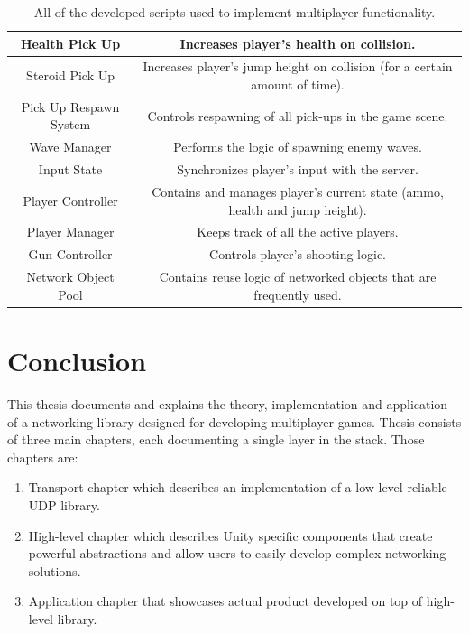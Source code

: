\documentclass[times, utf8, diplomski]{fer}
\begin{document}
\begin{table}[H]
{\begin{tabular}{|c|c|}
			Health Pick Up          & Increases player's health on collision.                                     \\ \hline
			Steroid Pick Up         & Increases player's jump height on collision (for a certain amount of time). \\ \hline
			Pick Up Respawn System  & Controls respawning of all pick-ups in the game scene.                      \\ \hline
			Wave Manager            & Performs the logic of spawning enemy waves.                                 \\ \hline
			Input State             & Synchronizes player's input with the server.                                \\ \hline
			Player Controller       & Contains and manages player's current state (ammo, health and jump height). \\ \hline
			Player Manager          & Keeps track of all the active players.                                      \\ \hline
			Gun Controller          & Controls player's shooting logic.                                           \\ \hline
			Network Object Pool     & Contains reuse logic of networked objects that are frequently used.         \\ \hline
		\end{tabular}%
	}
	\caption{All of the developed scripts used to implement multiplayer functionality.}
	\label{table:game-scene-network-scripts}
\end{table}



\chapter{Conclusion}
This thesis documents and explains the theory, implementation and application of a networking library designed for developing multiplayer games. Thesis consists of three main chapters, each documenting a single layer in the stack. Those chapters are:

\begin{enumerate}
	\item Transport chapter which describes an implementation of a low-level reliable UDP library.
	\item High-level chapter which describes Unity specific components that create powerful abstractions and allow users to easily develop complex networking solutions.
	\item Application chapter that showcases actual product developed on top of high-level library. 
\end{enumerate}
\end{document}
